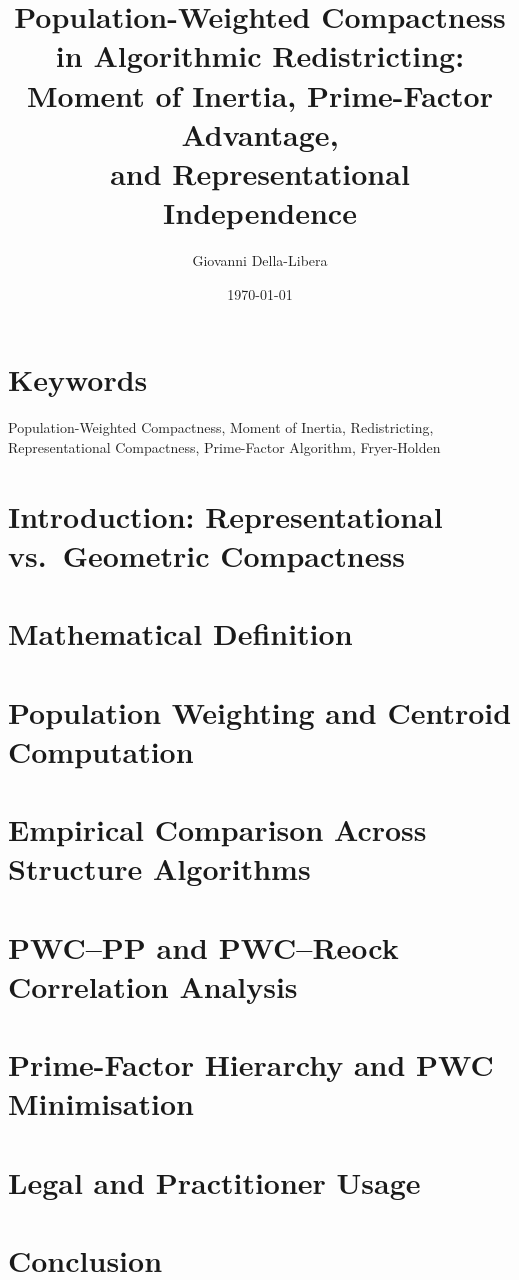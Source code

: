 \documentclass[12pt]{article}
\title{\textbf{Population-Weighted Compactness in Algorithmic Redistricting:\\
Moment of Inertia, Prime-Factor Advantage,\\
and Representational Independence}}
\author{Giovanni Della-Libera}
\date{\today}
\begin{document}
\maketitle

\begin{abstract}

\end{abstract}

\section*{Keywords}
Population-Weighted Compactness, Moment of Inertia, Redistricting,
Representational Compactness, Prime-Factor Algorithm, Fryer-Holden

\section{Introduction: Representational vs.\ Geometric Compactness}


\section{Mathematical Definition}


\section{Population Weighting and Centroid Computation}


\section{Empirical Comparison Across Structure Algorithms}


\section{PWC--PP and PWC--Reock Correlation Analysis}


\section{Prime-Factor Hierarchy and PWC Minimisation}


\section{Legal and Practitioner Usage}


\section{Conclusion}




\end{document}
